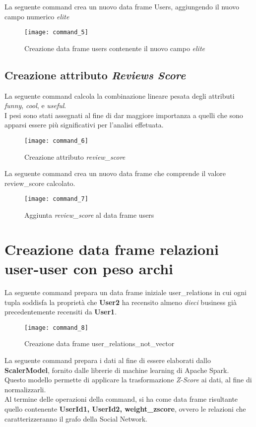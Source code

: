 La seguente command crea un nuovo data frame Users, aggiungendo il nuovo campo
numerico \textit{elite}
\begin{figure}[!htbp]
	\texttt{[image: command\_5]}
	\caption{Creazione data frame users contenente il nuovo campo \textit{elite}}
	\label{command_5}
\end{figure}

\subsection{Creazione attributo \textit{Reviews Score}}
La seguente command calcola la combinazione lineare pesata degli attributi \textit{funny},
\textit{cool}, e \textit{useful}.\\
I pesi sono stati assegnati al fine di dar maggiore importanza a quelli che
sono apparsi essere più significativi per l'analisi effetuata.
\begin{figure}[!htbp]
	\texttt{[image: command\_6]}
	\caption{Creazione attributo \textit{review\_score}}
	\label{command_6}
\end{figure}

La seguente command crea un nuovo data frame che comprende il valore review\_score
calcolato.
\begin{figure}[!htbp]
	\texttt{[image: command\_7]}
	\caption{Aggiunta \textit{review\_score} al data frame users}
	\label{command_7}
\end{figure}

\clearpage

\section{Creazione data frame relazioni user-user con peso archi}
La seguente command prepara un data frame iniziale user\_relations in cui ogni tupla
soddisfa la proprietà che \textbf{User2} ha recensito almeno \textit{dieci}
business già precedentemente recensiti da \textbf{User1}.
\begin{figure}[!htbp]
	\texttt{[image: command\_8]}
	\caption{Creazione data frame user\_relations\_not\_vector}
	\label{command_8}
\end{figure}

\clearpage

La seguente command prepara i dati al fine di essere elaborati dallo
\textbf{ScalerModel}, fornito dalle librerie di machine learning di Apache Spark.\\
Questo modello permette di applicare la trasformazione \textit{Z-Score} ai dati,
al fine di normalizzarli.\\
Al termine delle operazioni della command, si ha come data frame risultante quello
contenente \textbf{UserId1, UserId2, weight\_zscore}, ovvero le relazioni
che caratterizzeranno il grafo della Social Network.


